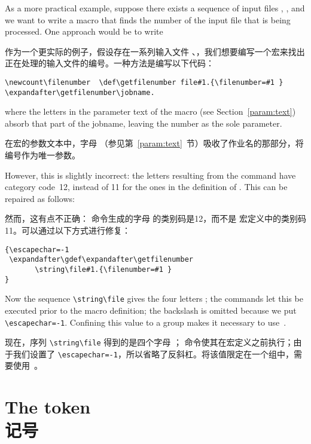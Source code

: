 As a more practical example, suppose there exists a sequence
of input files , \label{ex:jobnumber},
and we want to
write a macro that finds the number of the input file
that is being processed. One approach would be to write

作为一个更实际的例子，假设存在一系列输入文件 、\label{ex:jobnumber}，我们想要编写一个宏来找出正在处理的输入文件的编号。一种方法是编写以下代码：
\begin{verbatim}
\newcount\filenumber  \def\getfilenumber file#1.{\filenumber=#1 }
\expandafter\getfilenumber\jobname.
\end{verbatim}
where the letters  in the parameter text of the
macro (see Section~\ref{param:text}) absorb that part of the
jobname, leaving the number as the sole parameter.

在宏的参数文本中，字母 （参见第~\ref{param:text}~节）吸收了作业名的那部分，将编号作为唯一参数。

However, this is slightly incorrect: the letters  resulting
from the  command have category code~12, instead of
11 for the ones in the definition of .
This can be repaired as follows:

然而，这有点不正确： 命令生成的字母  的类别码是12，而不是  宏定义中的类别码11。可以通过以下方式进行修复：
\begin{verbatim}
{\escapechar=-1
 \expandafter\gdef\expandafter\getfilenumber
       \string\file#1.{\filenumber=#1 }
}
\end{verbatim}
\awp
Now the sequence \verb>\string\file> gives the four
letters ; 
the  commands let this be executed prior to
the macro definition;
the backslash is omitted because we put \verb>\escapechar=-1>.
Confining this value to a group makes it necessary to use~.

现在，序列 \verb>\string\file> 得到的是四个字母 ； 命令使其在宏定义之前执行；由于我们设置了 \verb>\escapechar=-1>，所以省略了反斜杠。将该值限定在一个组中，需要使用~。



\section{The \lowercase{} token\\\lowercase{} 记号}

